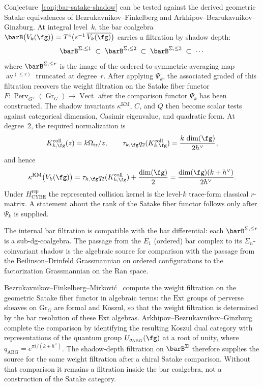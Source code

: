 \begin{remark}
\label{rem:derived-satake-shadow-tower}
\ClaimStatusConjectured
{}
Conjecture~\ref{conj:bar-satake-shadow} can be tested against the
derived geometric Satake equivalences of Bezrukavnikov--Finkelberg
and Arkhipov--Bezrukavnikov--Ginzburg.
At integral level~$k$, the bar coalgebra
$\barB\bigl(V_k(\fg)\bigr) = T^c\bigl(s^{-1}\,\overline{V_k(\fg)}\bigr)$
carries a filtration by shadow depth:
\[
 \barB^{\Sigma,\leq 1} \;\subset\;
 \barB^{\Sigma,\leq 2} \;\subset\;
 \barB^{\Sigma,\leq 3} \;\subset\; \cdots
\]
where $\barB^{\Sigma,\leq r}$ is the image of the
ordered-to-symmetric averaging map
$\operatorname{av}^{(\leq r)}$ truncated at degree~$r$.
After applying $\Psi_k$, the associated graded of this filtration
recovers the weight filtration on the Satake fiber functor
$F \colon \operatorname{Perv}_{G^\vee}(\operatorname{Gr}_G)
\to \operatorname{Vect}$ after the comparison functor $\Psi_k$ has
been constructed. The shadow invariants $\kappa^{\mathrm{KM}}$, $C$,
and $Q$ then become scalar tests against categorical dimension,
Casimir eigenvalue, and quadratic form. At degree~$2$, the required
normalization is
\[
 K_{k,\fg}^{\mathrm{coll}}(z)=k\Omega_{\mathrm{tr}}/z,
 \qquad
 \tau_{k,\fg}q_2(K_{k,\fg}^{\mathrm{coll}})
 =\frac{k\,\dim(\fg)}{2h^\vee},
\]
and hence
\[
 \kappa^{\mathrm{KM}}\bigl(V_k(\fg)\bigr)
 =\tau_{k,\fg}q_2(K_{k,\fg}^{\mathrm{coll}})
  +\frac{\dim(\fg)}2
 =\frac{\dim(\fg)(k+h^\vee)}{2h^\vee}.
\]
Under $H_{\mathrm{CYBE}}^{\mathrm{rep}}$ the represented collision
kernel is the level-$k$ trace-form classical $r$-matrix. A statement about the
rank of the Satake fiber functor follows only after $\Psi_k$ is
supplied.

The internal bar filtration is compatible with the bar differential:
each
$\barB^{\Sigma,\leq r}$ is a sub-dg-coalgebra. The passage from the
$E_1$ (ordered) bar complex to its $\Sigma_n$-coinvariant shadow
is the algebraic source for comparison with the passage from the
Beilinson--Drinfeld Grassmannian on ordered configurations to the
factorization Grassmannian on the Ran space.

Bezrukavnikov--Finkelberg--Mirkovi\'{c}~\cite{BFM04}
compute the weight filtration on the geometric Satake fiber functor
in algebraic terms: the
$\mathrm{Ext}$ groups of perverse sheaves on $\mathrm{Gr}_G$ are
formal and Koszul, so that the weight filtration is determined by the
bar resolution of these $\mathrm{Ext}$ algebras.
Arkhipov--Bezrukavnikov--Ginzburg~\cite{ABG04} complete the comparison by
identifying the resulting Koszul dual category with representations of
the quantum group $U_{q_{\mathrm{ABG}}}(\fg)$ at a root of unity,
where $q_{\mathrm{ABG}} = e^{\pi i/(k + h^\vee)}$.
The shadow-depth filtration on $\barB^\Sigma$ therefore supplies the
source for the same weight filtration after a chiral Satake
comparison. Without that comparison it remains a filtration inside the
bar coalgebra, not a construction of the Satake category.
\end{remark}


